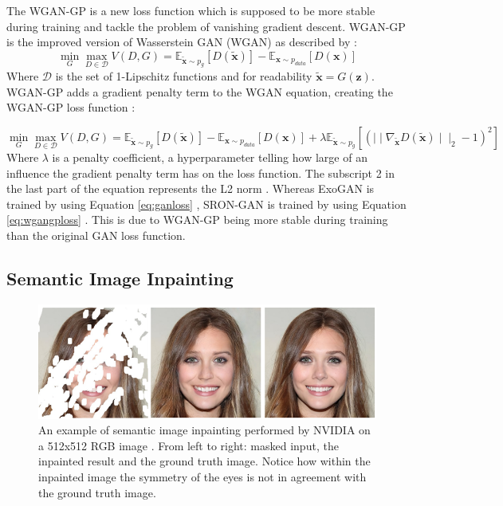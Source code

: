 The WGAN-GP is a new loss function which is supposed to be more stable during training and tackle the problem of vanishing gradient descent. WGAN-GP is the improved version of Wasserstein GAN (WGAN) as described by \cite{arjovsky2017wasserstein}:
\begin{equation}
    \min_{G} \max_{D \in \mathcal{D}} V(D,G) = \mathbb{E}_{\boldsymbol{\tilde{x}} \sim p_g} [D(\boldsymbol{\tilde{x}})] - \mathbb{E}_{\boldsymbol{x} \sim p_{data}} [D(\boldsymbol{x})]
    \label{eq:wgan}
\end{equation}
Where $\mathcal{D}$ is the set of 1-Lipschitz functions and for readability $\boldsymbol{\tilde{x}}=G(\boldsymbol{z})$. WGAN-GP adds a gradient penalty term to the WGAN equation, creating the WGAN-GP loss function \cite{gulrajani2017improved}:

\begin{equation}
    \min_{G} \max_{D \in \mathcal{D}} V(D,G) = \mathbb{E}_{\boldsymbol{\tilde{x}} \sim p_g} [D(\boldsymbol{\tilde{x}})] - \mathbb{E}_{\boldsymbol{x} \sim p_{data}} [D(\boldsymbol{x})] + \lambda \mathbb{E}_{\boldsymbol{\tilde{x}} \sim p_g} [(\mid \mid \nabla_{\tilde{\boldsymbol{x}}} D(\boldsymbol{\tilde{x}}) \mid \mid _2 - 1 )^2]
    \label{eq:wgangploss}
\end{equation}
Where $\lambda$ is a penalty coefficient, a hyperparameter telling how large of an influence the gradient penalty term has on the loss function. The subscript 2 in the last part of the equation represents the L2 norm \cite{ng2004feature}. Whereas ExoGAN is trained by using Equation \ref{eq:ganloss} , SRON-GAN is trained by using Equation \ref{eq:wgangploss} \cite{zingales2018exogan}. This is due to WGAN-GP being more stable during training than the original GAN loss function.

\subsection{Semantic Image Inpainting}\label{semantic image inpainting}

\begin{figure} [!htb]
    \centering
    \includegraphics[scale=0.6]{figuren/fig6.png}
    \caption{An example of semantic image inpainting performed by NVIDIA on a 512x512 RGB image \cite{liu2018image}. From left to right: masked input, the inpainted result and the ground truth image. Notice how within the inpainted image the symmetry of the eyes is not in agreement with the ground truth image.}
    \label{fig:inpainting-nvidia}
\end{figure}


